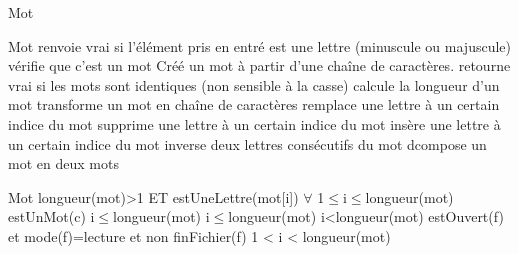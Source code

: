 \begin{tad}
	\begin{tadOperations}{Mot}
			{\tadUnParam{\caractere}}%
			{\tadUnParam{\booleen}}
			{\tadUnParam{\chaine}}%
			{\tadUnParam{\booleen}}
			{\tadUnParam{\chaine}}%
			{}
			{}%
			{\tadUnParam{\booleen}}
			{}%
			{}
			{}%
			{\tadUnParam{\chaine}}
			{}%
			{}
			{}%
			{}
			{}%
			{}
			{}%
			{}
			{}%
			{}
	\end{tadOperations}
	
	\begin{tadSemantiques}{Mot}
			{renvoie vrai si l'\'el\'ement pris en entr\'e est une lettre (minuscule ou majuscule)}
			{v\'erifie que c’est un mot}
			{Cr\'e\'e un mot \`a partir d’une cha\^ine de caract\`eres.}
			{retourne vrai si les mots sont identiques (non sensible à la casse)}
			{calcule la longueur d'un mot}
			{transforme un mot en cha\^ine de caract\`eres}
			{remplace une lettre \`a un certain indice du mot}
			{supprime une lettre \`a un certain indice du mot}
			{ins\`ere une lettre \`a un certain indice du mot}
			{inverse deux lettres cons\'ecutifs du mot}
			{dcompose un mot en deux mots}
	\end{tadSemantiques}
	
	\begin{tadPreconditions}{Mot}
			{longueur(mot)>1 ET estUneLettre(mot[i]) $\forall$ 1$\leq$i$\leq$longueur(mot)}
			{estUnMot(c)}
			{i$\leq$longueur(mot)}
			{i$\leq$longueur(mot)}
			{i<longueur(mot)}
			{estOuvert(f) et mode(f)=lecture et non finFichier(f)}
			{1 < i < longueur(mot)}
	\end{tadPreconditions}
	
\end{tad}
